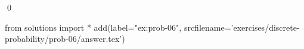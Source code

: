 
\begin{ex} 
  \label{ex:prob-06}
  
  \qed
\end{ex} 
\begin{python0}
from solutions import *
add(label="ex:prob-06",
    srcfilename='exercises/discrete-probability/prob-06/answer.tex') 
\end{python0}
